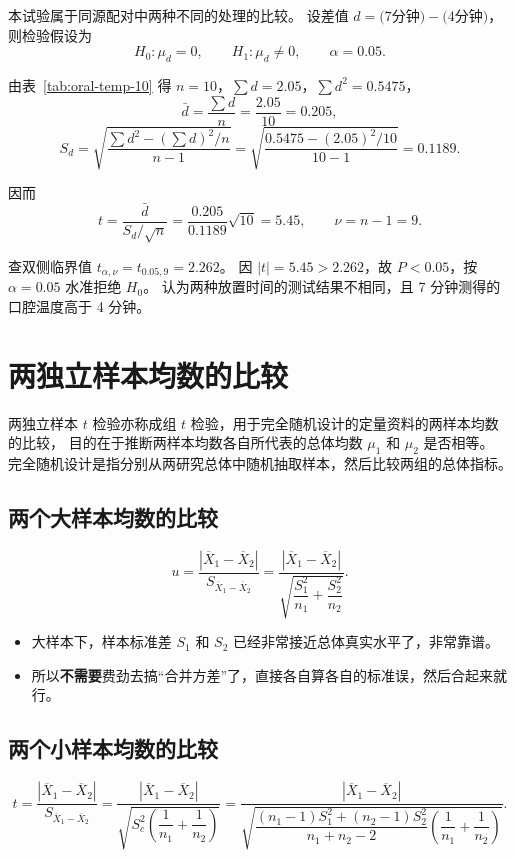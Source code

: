 \documentclass[lang=cn,10pt]{elegantbook}
\begin{document}
\vspace{0.2cm}
\begin{solution}
    本试验属于同源配对中两种不同的处理的比较。
    设差值 $d=\text{(7分钟)}-\text{(4分钟)}$，则检验假设为
    \[
      H_0: \mu_d=0, \qquad H_1: \mu_d\neq 0, \qquad \alpha=0.05.
    \]

    由表~\ref{tab:oral-temp-10} 得 $n=10$，$\sum d=2.05$，$\sum d^2=0.5475$，
    \[
      \bar d=\frac{\sum d}{n}=\frac{2.05}{10}=0.205,
    \]
    \[
      S_d=\sqrt{\frac{\sum d^2-(\sum d)^2/n}{n-1}}=
      \sqrt{\frac{0.5475-(2.05)^2/10}{10-1}}=0.1189.
    \]

    因而
    \[
      t=\frac{\bar d}{S_d/\sqrt{n}}=\frac{0.205}{0.1189}\sqrt{10}=5.45,\qquad \nu=n-1=9.
    \]

    查双侧临界值 $t_{\alpha,\nu}=t_{0.05,9}=2.262$。
    因 $|t|=5.45>2.262$，故 $P<0.05$，按 $\alpha=0.05$ 水准拒绝 $H_0$。
    认为两种放置时间的测试结果不相同，且 7 分钟测得的口腔温度高于 4 分钟。
    
\end{solution}

\section{两独立样本均数的比较}
两独立样本 $t$ 检验亦称成组 $t$ 检验，用于完全随机设计的定量资料的两样本均数的比较，
目的在于推断两样本均数各自所代表的总体均数 $\mu_1$ 和 $\mu_2$ 是否相等。
完全随机设计是指分别从两研究总体中随机抽取样本，然后比较两组的总体指标。

\subsection{两个大样本均数的比较}

\begin{equation}
  u=\frac{\left|\overline X_1-\overline X_2\right|}{S_{\overline X_1-\overline X_2}}
  =\frac{\left|\overline X_1-\overline X_2\right|}{\sqrt{\dfrac{S_1^2}{n_1}+\dfrac{S_2^2}{n_2}}}.    
\end{equation}


\begin{itemize}
    \item 大样本下，样本标准差 $S_1$ 和 $S_2$ 已经非常接近总体真实水平了，非常靠谱。
    \item 所以\textbf{不需要}费劲去搞“合并方差”了，直接各自算各自的标准误，然后合起来就行。
\end{itemize}

\subsection{两个小样本均数的比较}
\begin{equation}
  t=\frac{\left|\overline X_1-\overline X_2\right|}{S_{\overline X_1-\overline X_2}}
  =\frac{\left|\overline X_1-\overline X_2\right|}{\sqrt{S_c^2\left(\dfrac{1}{n_1}+\dfrac{1}{n_2}\right)}}
  =\frac{\left|\overline X_1-\overline X_2\right|}{\sqrt{\dfrac{(n_1-1)S_1^2+(n_2-1)S_2^2}{n_1+n_2-2}\left(\dfrac{1}{n_1}+\dfrac{1}{n_2}\right)}}.
\end{equation}
\end{document}
